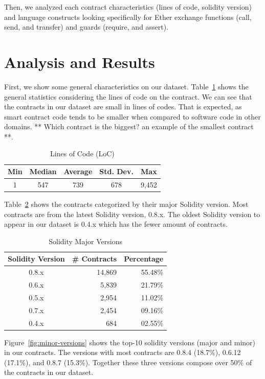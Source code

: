 \documentclass[10pt,conference]{IEEEtran}
\begin{document}
Then, we analyzed each contract characteristics (lines of code, solidity version) and language constructs looking specifically for Ether exchange functions (call, send, and transfer) and guards (require, and assert). 

\section{Analysis and Results}

First, we show some general characteristics on our dataset.
Table~\ref{tab:loc} shows the general statistics considering the lines of code on the contract. We can see that the contracts in our dataset are small in lines of codes. That is expected, as smart contract code tends to be smaller when compared to software code in other domains. ** Which contract is the biggest? an example of the smallest contract **.

\begin{table}
\center
  \caption{Lines of Code (LoC)}
  \label{tab:loc}
  \begin{tabular}{c c c c c}
    \hline
    Min & Median & Average & Std. Dev. & Max \\
    \hline
   1 & 547 & 739 & 678 & 9,452 \\
  \hline
\end{tabular}
\end{table}

Table~\ref{tab:major-versions} shows the contracts categorized by their major Solidity version. Most contracts are from the latest Solidity version, 0.8.x. The oldest Solidity version to appear in our dataset is 0.4.x which has the fewer amount of contracts.

\begin{table}
\center
  \caption{Solidity Major Versions}
  \label{tab:major-versions}
  \begin{tabular}{crr}
    \hline
    Solidity Version & \# Contracts & Percentage\\
    \hline
    0.8.x & 14,869 &55.48\%\\
    0.6.x & 5,839 &21.79\%\\
    0.5.x & 2,954 &11.02\%\\
    0.7.x & 2,454 &09.16\%\\
    0.4.x & 684 &02.55\%\\
  \hline
\end{tabular}
\end{table}

Figure~\ref{fig:minor-versions} shows the top-10 solidity versions (major and minor) in our contracts. The versions with most contracts are 0.8.4 (18.7\%), 0.6.12 (17.1\%), and 0.8.7 (15.3\%). Together these three versions compose over 50\% of the contracts in our dataset.
\end{document}
